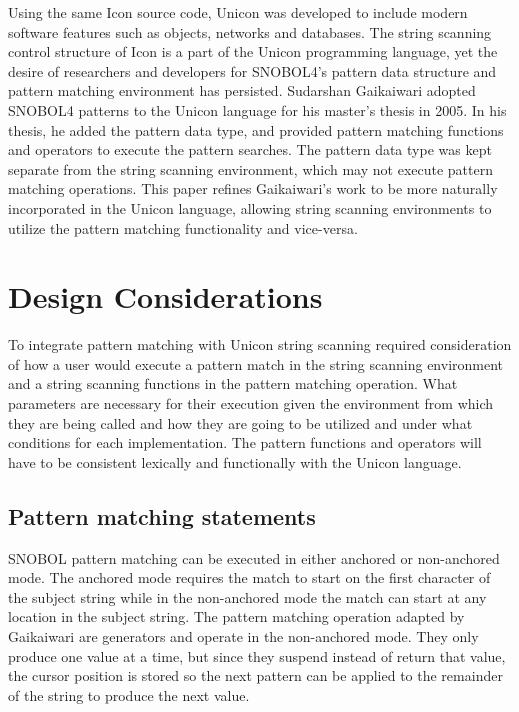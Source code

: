 \documentclass{article}
\begin{document}
Using the same Icon source code, Unicon was developed to include modern software features such as objects, networks and databases. \cite{JefferyUnicon} The string scanning control structure of Icon is a part of the Unicon programming language, yet the desire of researchers and developers for SNOBOL4's pattern data structure and pattern matching environment has persisted.  Sudarshan Gaikaiwari adopted SNOBOL4 patterns to the Unicon language for his master's thesis in 2005.  In his thesis, he added the pattern data type, and provided pattern matching functions and operators to execute the pattern searches.\cite{Gaikaiwari2005}  The pattern data type was kept separate from the string scanning environment, which may not execute pattern matching operations.  This paper refines Gaikaiwari's work to be more naturally incorporated in the Unicon language, allowing string scanning environments to utilize the pattern matching functionality and vice-versa.

\section{Design Considerations}
To integrate pattern matching with Unicon string scanning required consideration of how a user would execute a pattern match in the string scanning environment and a string scanning functions in the pattern matching operation.  What parameters are necessary for their execution given the environment from which they are being called and how they are going to be utilized and under what conditions for each implementation.  The pattern functions and operators will have to be consistent lexically and functionally with the Unicon language.

\subsection{Pattern matching statements}
SNOBOL pattern matching can be executed in either anchored or non-anchored mode.  The anchored mode requires the match to start on the first character of the subject string while in the non-anchored mode the match can start at any location in the subject string.\cite{Snobol}  The pattern matching operation adapted by Gaikaiwari are generators and operate in the non-anchored mode.\cite{Gaikaiwari2005}  They only produce one value at a time, but since they suspend instead of return that value, the cursor position is stored so the next pattern can be applied to the remainder of the string to produce the next value. \cite{JefferyUnicon}
\end{document}
